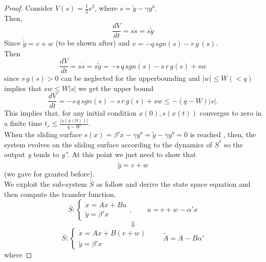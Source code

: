 \begin{proof}
	Consider $V(s)=\frac{1}{2}s^2$, where $s=\tilde{y}-\gamma y°$.\\ Then, \[\frac{dV}{dt}=s\dot{s}=s\dot{\tilde{y}}\] Since $\dot{\tilde{y}}=v+w$ (to be shown after) and $v=-q\, sgn(s)-r\,g\,(s)$.\\ Then \[\frac{dV}{dt}=s\dot{s}=s\dot{\tilde{y}}=-s\,q\,sgn(s)-s\,r\,g(s)+sw\]
	since $s\,g(s)>0$ can be neglected for the upperbounding and $|w|\le W(<q)$ implies that $sw \le W|s|$ we get the upper bound \[\frac{dV}{dt}=-s\,q\,sgn(s)-s\,r\,g(s)+sw\le -(q-W)|s|.\] This implies that, for any initial condition $x(0),s(x(t))$ converges to zero in a finite time $t_r\le \frac{|s(x(0))|}{q-W}$.\\When the sliding surface  $s(x)=\beta'x-\gamma y°=\tilde{y}-\gamma y°=0$ is reached , then, the system evolves on the sliding surface according to the dynamics of $S^*$ so the output \emph{y} tends to \emph{y°}. At this point we just need to show that \[\dot{\tilde{y}}=v+w\] (we gave for granted before).\\
We exploit the sub-system $\bar{S}$ as follow and derive the state space equation and then compute the transfer function.
\[\bar{S}:\begin{cases}
	\dot{x}=Ax+Bu\\
	\tilde{y}=\beta'x
\end{cases},\qquad u=v+w-\alpha'x
\] \[\Downarrow\]
\[\bar{S}:\begin{cases}
	\dot{x}=Ax+B(v+w)\\
	\tilde{y}=\beta'x
\end{cases}\qquad \tilde{A}=A-B\alpha'
\] where


\end{proof}
